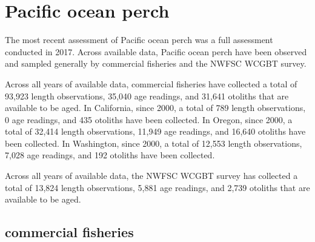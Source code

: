 \documentclass[11pt,
  english,
  letterpaper,
]{article}
\begin{document}

\hypertarget{pacific-ocean-perch}{%
\section{Pacific ocean perch}\label{pacific-ocean-perch}}

\leavevmode\tagmcend\tagstructend


The most recent assessment of Pacific ocean perch was a full assessment conducted in 2017. Across available data, Pacific ocean perch have been observed and sampled generally by commercial fisheries and the NWFSC WCGBT survey.

\leavevmode\tagmcend\tagstructend\par


Across all years of available data, commercial fisheries have collected a total of 93,923 length observations, 35,040 age readings, and 31,641 otoliths that are available to be aged. In California, since 2000, a total of 789 length observations, 0 age readings, and 435 otoliths have been collected. In Oregon, since 2000, a total of 32,414 length observations, 11,949 age readings, and 16,640 otoliths have been collected. In Washington, since 2000, a total of 12,553 length observations, 7,028 age readings, and 192 otoliths have been collected.

\leavevmode\tagmcend\tagstructend\par


Across all years of available data, the NWFSC WCGBT survey has collected a total of 13,824 length observations, 5,881 age readings, and 2,739 otoliths that are available to be aged.

\leavevmode\tagmcend\tagstructend\par


\hypertarget{commercial-fisheries-33}{%
\subsection{commercial fisheries}\label{commercial-fisheries-33}}

\leavevmode\tagmcend\tagstructend
\end{document}
